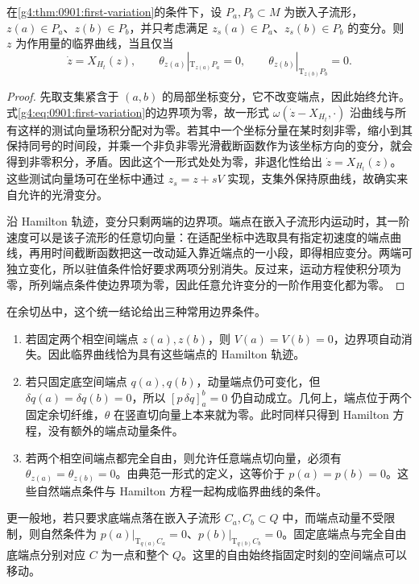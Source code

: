 \begin{proposition}\label{g4:prop:0901:endpoint-conditions}
	在\cref{g4:thm:0901:first-variation}的条件下，设 \(P_a,P_b\subset M\) 为嵌入子流形，\(z(a)\in P_a\)、\(z(b)\in P_b\)，并只考虑满足 \(z_s(a)\in P_a\)、\(z_s(b)\in P_b\) 的变分。则 \(z\) 为作用量的临界曲线，当且仅当
	\[
		\dot z=X_{H_t}(z),\qquad
		\theta_{z(a)}|_{\mathrm{T}_{z(a)}P_a}=0,\qquad
		\theta_{z(b)}|_{\mathrm{T}_{z(b)}P_b}=0.
	\]
\end{proposition}
\begin{proof}
	先取支集紧含于 \((a,b)\) 的局部坐标变分，它不改变端点，因此始终允许。式\eqref{g4:eq:0901:first-variation}的边界项为零，故一形式 \(\omega(\dot z-X_{H_t},\cdot)\) 沿曲线与所有这样的测试向量场积分配对为零。若其中一个坐标分量在某时刻非零，缩小到其保持同号的时间段，并乘一个非负非零光滑截断函数作为该坐标方向的变分，就会得到非零积分，矛盾。因此这个一形式处处为零，非退化性给出 \(\dot z=X_{H_t}(z)\)。这些测试向量场可在坐标中通过 \(z_s=z+sV\) 实现，支集外保持原曲线，故确实来自允许的光滑变分。

	沿 Hamilton 轨迹，变分只剩两端的边界项。端点在嵌入子流形内运动时，其一阶速度可以是该子流形的任意切向量：在适配坐标中选取具有指定初速度的端点曲线，再用时间截断函数把这一改动延入靠近端点的一小段，即得相应变分。两端可独立变化，所以驻值条件恰好要求两项分别消失。反过来，运动方程使积分项为零，所列端点条件使边界项为零，因此任意允许变分的一阶作用变化都为零。
\end{proof}

在余切丛中，这个统一结论给出三种常用边界条件。
\begin{enumerate}
	\item 若固定两个相空间端点 \(z(a),z(b)\)，则 \(V(a)=V(b)=0\)，边界项自动消失。因此临界曲线恰为具有这些端点的 Hamilton 轨迹。
	\item 若只固定底空间端点 \(q(a),q(b)\)，动量端点仍可变化，但 \(\delta q(a)=\delta q(b)=0\)，所以 \([p\,\delta q]_a^b=0\) 仍自动成立。几何上，端点位于两个固定余切纤维，\(\theta\) 在竖直切向量上本来就为零。此时同样只得到 Hamilton 方程，没有额外的端点动量条件。
	\item 若两个相空间端点都完全自由，则允许任意端点切向量，必须有 \(\theta_{z(a)}=\theta_{z(b)}=0\)。由典范一形式的定义，这等价于 \(p(a)=p(b)=0\)。这些自然端点条件与 Hamilton 方程一起构成临界曲线的条件。
\end{enumerate}

更一般地，若只要求底端点落在嵌入子流形 \(C_a,C_b\subset Q\) 中，而端点动量不受限制，则自然条件为 \(p(a)|_{\mathrm{T}_{q(a)}C_a}=0\)、\(p(b)|_{\mathrm{T}_{q(b)}C_b}=0\)。固定底端点与完全自由底端点分别对应 \(C\) 为一点和整个 \(Q\)。这里的自由始终指固定时刻的空间端点可以移动。

